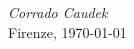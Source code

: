 %
%


\vspace{\baselineskip}
\begin{flushright}
\noindent
{\it Corrado Caudek}\\
Firenze, \today\\
\end{flushright}



